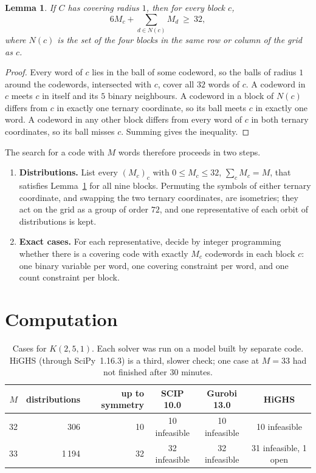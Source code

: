 \documentclass[11pt]{article}
\newtheorem{lemma}[theorem]{Lemma}
\theoremstyle{remark}
\begin{document}
\begin{lemma}\label{lem:count}
If $C$ has covering radius $1$, then for every block $c$,
\[
6M_c+\sum_{d\in N(c)} M_d\ \ge\ 32,
\]
where $N(c)$ is the set of the four blocks in the same row or column of the grid as $c$.
\end{lemma}

\begin{proof}
Every word of $c$ lies in the ball of some codeword, so the balls of radius $1$ around the
codewords, intersected with $c$, cover all $32$ words of $c$. A codeword in $c$ meets $c$ in
itself and its $5$ binary neighbours. A codeword in a block of $N(c)$ differs from $c$ in exactly
one ternary coordinate, so its ball meets $c$ in exactly one word. A codeword in any other block
differs from every word of $c$ in both ternary coordinates, so its ball misses $c$. Summing gives
the inequality.
\end{proof}

The search for a code with $M$ words therefore proceeds in two steps.
\begin{enumerate}
\item \textbf{Distributions.} List every $(M_c)_c$ with $0\le M_c\le 32$, $\sum_c M_c=M$, that
  satisfies Lemma~\ref{lem:count} for all nine blocks. Permuting the symbols of either ternary
  coordinate, and swapping the two ternary coordinates, are isometries; they act on the grid as a
  group of order $72$, and one representative of each orbit of distributions is kept.
\item \textbf{Exact cases.} For each representative, decide by integer programming whether there
  is a covering code with exactly $M_c$ codewords in each block $c$: one binary variable per word,
  one covering constraint per word, and one count constraint per block.
\end{enumerate}

\section{Computation}

\begin{table}[h]
\centering
\begin{tabular}{rrrccc}
\toprule
$M$ & distributions & up to symmetry & SCIP 10.0 & Gurobi 13.0 & HiGHS \\
\midrule
32 & 306   & 10 & 10 infeasible & 10 infeasible & 10 infeasible \\
33 & 1\,194 & 32 & 32 infeasible & 32 infeasible & 31 infeasible, 1 open \\
\bottomrule
\end{tabular}
\caption{Cases for $K(2,5,1)$. Each solver was run on a model built by separate code. HiGHS
(through SciPy~1.16.3) is a third, slower check; one case at $M=33$ had not finished after
30 minutes.}
\label{tab:cases}
\end{table}
\end{document}
